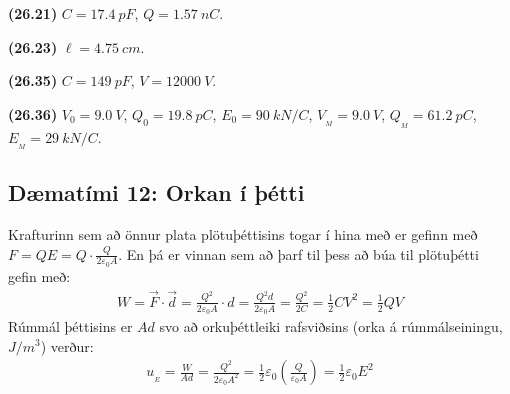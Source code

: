 \begin{tcolorbox}
\begin{enumerate*}[label = \vspace{0.15cm} ]
  \item \textbf{(26.21)} $C = \SI{17.4}{pF}$, $Q = \SI{1.57}{nC}$.
  \item \textbf{(26.23)} $\ell = \SI{4.75}{cm}$.
  \item \textbf{(26.35)} $C = \SI{149}{pF}$, $V = \SI{12000}{V}$.
  \item \textbf{(26.36)} $V_0 = \SI{9.0}{V}$, $Q_0 = \SI{19.8}{pC}$, $E_0 = \SI{90}{kN/C}$, $V_{\!_M} = \SI{9.0}{V}$, $Q_{\!_M} = \SI{61.2}{pC}$, $E_{\!_M} = \SI{29}{kN/C}$. 
\end{enumerate*}
\end{tcolorbox}

\newpage

\subsection*{Dæmatími 12: Orkan í þétti}

\begin{tcolorbox}
Krafturinn sem að önnur plata plötuþéttisins togar í hina með er gefinn með $F = QE = Q \cdot \frac{Q}{2 \varepsilon_0 A}$. En þá er vinnan sem að þarf til þess að búa til plötuþétti gefin með:
\begin{align*}
    W = \vec{F} \cdot \vec{d} = \frac{Q^2}{2 \varepsilon_0 A} \cdot d = \frac{Q^2 d}{2 \varepsilon_0 A} = \frac{Q^2}{2C} = \frac{1}{2}CV^2 = \frac{1}{2}QV
\end{align*}
Rúmmál þéttisins er $Ad$ svo að orkuþéttleiki rafsviðsins (orka á rúmmálseiningu, $\si{J/m^3}$) verður:
\begin{align*}
    u_{\!_{E}} = \frac{W}{Ad} = \frac{Q^2}{2 \varepsilon_0 A^2} = \frac{1}{2} \varepsilon_0 \left( \frac{Q}{\varepsilon_0 A} \right) = \frac{1}{2} \varepsilon_0 E^2
\end{align*}
\end{tcolorbox}

